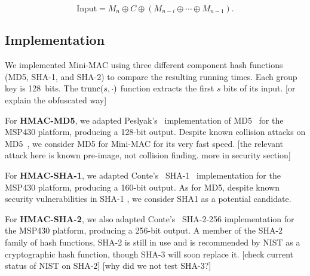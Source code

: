 \begin{equation}
\text{Input} = M_n \oplus C \oplus (M_{n-i} \oplus \cdots \oplus M_{n-1}) .
\end{equation}


%


\subsection{Implementation}
\label{implementation}

We implemented Mini-MAC using three different component hash functions (MD5, SHA-1, and SHA-2) to compare the resulting running times.  
Each group key is 128~bits.  The $\hbox{trunc}(s,\cdot)$ function extracts the first $s$ bits of its input. [or explain the obfuscated way]

For \textbf{HMAC-MD5},
we adapted Peslyak's~\cite{Peslyak} implementation of MD5~\cite{MD5} for the MSP430 platform, producing a 128-bit output. 
Despite known collision attacks on MD5~\cite{Wang-MD5}, we consider
MD5 for Mini-MAC for its very fast speed.  [the relevant attack here is known pre-image, not
collision finding.  more in security section]

For \textbf{HMAC-SHA-1},
we adapted Conte's~\cite{Conte-SHA1} SHA-1~\cite{FIPS-180-4} implementation for the MSP430 platform, producing a 160-bit output. 
As for MD5, despite known security vulnerabilities in SHA-1 \cite{Wang-SHA1}, 
we consider SHA1 as a potential candidate.

For \textbf{HMAC-SHA-2},
we also adapted Conte's~\cite{Conte-SHA256} SHA-2-256 implementation for the MSP430 platform, producing a 256-bit output. 
A member of the SHA-2 family of hash functions, SHA-2 is still in use and is recommended by NIST as a cryptographic hash function, 
though SHA-3 will soon replace it\cite{FIPS-180-4}. [check current status of NIST on SHA-2]
[why did we not test SHA-3?]